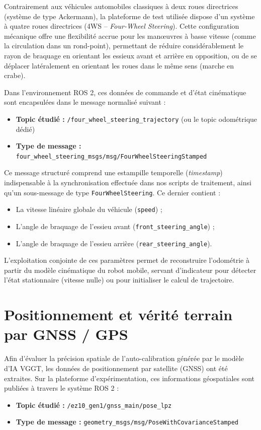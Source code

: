 \documentclass[12pt,a4paper,oneside]{report}
\begin{document}
Contrairement aux véhicules automobiles classiques à deux roues directrices (système de type Ackermann), la plateforme de test utilisée dispose d'un système à quatre roues directrices (4WS -- \textit{Four-Wheel Steering}). Cette configuration mécanique offre une flexibilité accrue pour les manœuvres à basse vitesse (comme la circulation dans un rond-point), permettant de réduire considérablement le rayon de braquage en orientant les essieux avant et arrière en opposition, ou de se déplacer latéralement en orientant les roues dans le même sens (marche en crabe).



Dans l'environnement ROS 2, ces données de commande et d'état cinématique sont encapsulées dans le message normalisé suivant :
\begin{itemize}
    \item \textbf{Topic étudié :} \texttt{/four\_wheel\_steering\_trajectory} (ou le topic odométrique dédié)
    \item \textbf{Type de message :} \texttt{four\_wheel\_steering\_msgs/msg/FourWheelSteeringStamped}
\end{itemize}

Ce message structuré comprend une estampille temporelle (\textit{timestamp}) indispensable à la synchronisation effectuée dans nos scripts de traitement, ainsi qu'un sous-message de type \texttt{FourWheelSteering}. Ce dernier contient :
\begin{itemize}
    \item La vitesse linéaire globale du véhicule (\texttt{speed}) ;
    \item L'angle de braquage de l'essieu avant (\texttt{front\_steering\_angle}) ;
    \item L'angle de braquage de l'essieu arrière (\texttt{rear\_steering\_angle}).
\end{itemize}

L'exploitation conjointe de ces paramètres permet de reconstruire l'odométrie à partir du modèle cinématique du robot mobile, servant d'indicateur pour détecter l'état stationnaire (vitesse nulle) ou pour initialiser le calcul de trajectoire.


\section{Positionnement et vérité terrain par GNSS / GPS}

Afin d'évaluer la précision spatiale de l'auto-calibration générée par le modèle d'IA VGGT, les données de positionnement par satellite (GNSS) ont été extraites. Sur la plateforme d'expérimentation, ces informations géospatiales sont publiées à travers le système ROS 2 :
\begin{itemize}
    \item \textbf{Topic étudié :} \texttt{/ez10\_gen1/gnss\_main/pose\_lpz}
    \item \textbf{Type de message :} \texttt{geometry\_msgs/msg/PoseWithCovarianceStamped}
\end{itemize}
\end{document}
